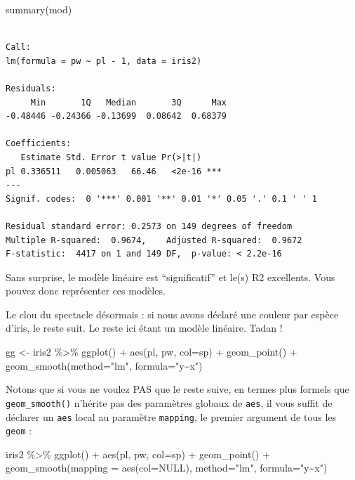 \documentclass[
  letterpaper,
  DIV=11,
  numbers=noendperiod]{scrreprt}
\newenvironment{Shaded}{\begin{snugshade}}{\end{snugshade}}
\newcommand{\AttributeTok}[1]{\textcolor[rgb]{0.40,0.45,0.13}{#1}}
\newcommand{\ConstantTok}[1]{\textcolor[rgb]{0.56,0.35,0.01}{#1}}
\newcommand{\FunctionTok}[1]{\textcolor[rgb]{0.28,0.35,0.67}{#1}}
\newcommand{\NormalTok}[1]{\textcolor[rgb]{0.00,0.23,0.31}{#1}}
\newcommand{\OtherTok}[1]{\textcolor[rgb]{0.00,0.23,0.31}{#1}}
\newcommand{\SpecialCharTok}[1]{\textcolor[rgb]{0.37,0.37,0.37}{#1}}
\newcommand{\StringTok}[1]{\textcolor[rgb]{0.13,0.47,0.30}{#1}}
\begin{document}
\begin{Shaded}
\begin{Highlighting}[]
\FunctionTok{summary}\NormalTok{(mod)}
\end{Highlighting}
\end{Shaded}

\begin{verbatim}

Call:
lm(formula = pw ~ pl - 1, data = iris2)

Residuals:
     Min       1Q   Median       3Q      Max 
-0.48446 -0.24366 -0.13699  0.08642  0.68379 

Coefficients:
   Estimate Std. Error t value Pr(>|t|)    
pl 0.336511   0.005063   66.46   <2e-16 ***
---
Signif. codes:  0 '***' 0.001 '**' 0.01 '*' 0.05 '.' 0.1 ' ' 1

Residual standard error: 0.2573 on 149 degrees of freedom
Multiple R-squared:  0.9674,    Adjusted R-squared:  0.9672 
F-statistic:  4417 on 1 and 149 DF,  p-value: < 2.2e-16
\end{verbatim}

Sans surprise, le modèle linéaire est ``significatif'' et le(s) R2
excellents. Vous pouvez donc représenter ces modèles.

Le clou du spectacle désormais : si nous avons déclaré une couleur par
espèce d'iris, le reste suit. Le reste ici étant un modèle linéaire.
Tadan !

\begin{Shaded}
\begin{Highlighting}[]
\NormalTok{gg }\OtherTok{\textless{}{-}}\NormalTok{ iris2 }\SpecialCharTok{\%\textgreater{}\%} 
  \FunctionTok{ggplot}\NormalTok{() }\SpecialCharTok{+} 
  \FunctionTok{aes}\NormalTok{(pl, pw, }\AttributeTok{col=}\NormalTok{sp) }\SpecialCharTok{+}
  \FunctionTok{geom\_point}\NormalTok{() }\SpecialCharTok{+}
  \FunctionTok{geom\_smooth}\NormalTok{(}\AttributeTok{method=}\StringTok{"lm"}\NormalTok{, }\AttributeTok{formula=}\StringTok{"y\textasciitilde{}x"}\NormalTok{)}
\end{Highlighting}
\end{Shaded}

Notons que si vous ne voulez PAS que le reste suive, en termes plus
formels que \texttt{geom\_smooth()} n'hérite pas des paramètres globaux
de \texttt{aes}, il vous suffit de déclarer un \texttt{aes} local au
paramètre \texttt{mapping}, le premier argument de tous les
\texttt{geom} :

\begin{Shaded}
\begin{Highlighting}[]
\NormalTok{iris2 }\SpecialCharTok{\%\textgreater{}\%} 
  \FunctionTok{ggplot}\NormalTok{() }\SpecialCharTok{+} 
  \FunctionTok{aes}\NormalTok{(pl, pw, }\AttributeTok{col=}\NormalTok{sp) }\SpecialCharTok{+}
  \FunctionTok{geom\_point}\NormalTok{() }\SpecialCharTok{+}
  \FunctionTok{geom\_smooth}\NormalTok{(}\AttributeTok{mapping =} \FunctionTok{aes}\NormalTok{(}\AttributeTok{col=}\ConstantTok{NULL}\NormalTok{), }\AttributeTok{method=}\StringTok{"lm"}\NormalTok{, }\AttributeTok{formula=}\StringTok{"y\textasciitilde{}x"}\NormalTok{)}
\end{Highlighting}
\end{Shaded}
\end{document}
